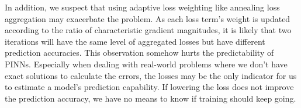 In addition, we suspect that using adaptive loss weighting like annealing loss aggregation may exacerbate the problem.
As each loss term's weight is updated according to the ratio of characteristic gradient magnitudes, it is likely that two iterations will have the same level of aggregated losses but have different prediction accuracies. 
This observation somehow hurts the predictability of PINNs.
Especially when dealing with real-world problems where we don't have exact solutions to calculate the errors, the losses may be the only indicator for us to estimate a model's prediction capability.
If lowering the loss does not improve the prediction accuracy, we have no means to know if training should keep going.
